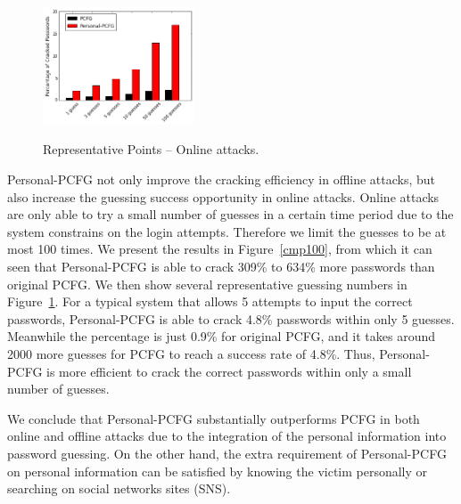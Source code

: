  \begin{figure}[t]
  \centering
  \caption{Representative Points -- Online attacks.}{}
  \label{points}
  \includegraphics[width=0.4\textwidth]{fig/online}
\vspace{-0.15in}
\end{figure}

Personal-PCFG not only improve the cracking efficiency in offline
attacks, but also increase the guessing success opportunity in online
attacks. Online attacks are only able to try a small number of guesses
in a certain time period due to the system constrains on the login
attempts. Therefore we limit the guesses to be at most 100 times. We present the results in Figure~\ref{cmp100}, from which it can seen that
Personal-PCFG is able to crack 309\% to 634\% more passwords than
original PCFG. We then show several representative guessing numbers in Figure~\ref{points}. For a typical system that allows 5
attempts to input the correct passwords, Personal-PCFG is able to
crack 4.8\% passwords within only 5 guesses. Meanwhile the percentage
is just 0.9\% for original PCFG, and it takes around 2000 more guesses
for PCFG to reach a success rate of 4.8\%. Thus, Personal-PCFG is more
efficient to crack the correct passwords within only a small number of
guesses.

We conclude that Personal-PCFG substantially outperforms PCFG in both online and
offline attacks due to the integration of the personal
information into password guessing. On the other hand, the extra
requirement of Personal-PCFG on personal information can be satisfied
by knowing the victim personally or searching on social networks sites
(SNS).

